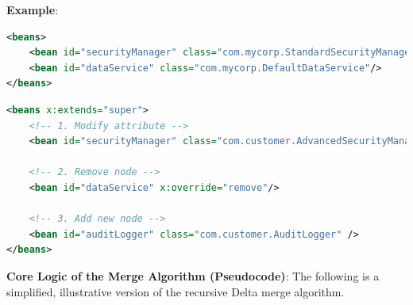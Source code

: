 \documentclass[11pt]{article}
\begin{document}
\textbf{Example}:
\begin{lstlisting}[language=XML, caption={Base Definition (`/beans/core.xml`)}]
<beans>
    <bean id="securityManager" class="com.mycorp.StandardSecurityManager"/>
    <bean id="dataService" class="com.mycorp.DefaultDataService"/>
</beans>
\end{lstlisting}

\begin{lstlisting}[language=XML, caption={Customer A's Delta Definition (`/\_delta/customer-a/beans/core.xml`)}]
<beans x:extends="super">
    <!-- 1. Modify attribute -->
    <bean id="securityManager" class="com.customer.AdvancedSecurityManager"/>

    <!-- 2. Remove node -->
    <bean id="dataService" x:override="remove"/>
    
    <!-- 3. Add new node -->
    <bean id="auditLogger" class="com.customer.AuditLogger" />
</beans>
\end{lstlisting}

\textbf{Core Logic of the Merge Algorithm (Pseudocode)}:
The following is a simplified, illustrative version of the recursive Delta merge algorithm.
\end{document}
